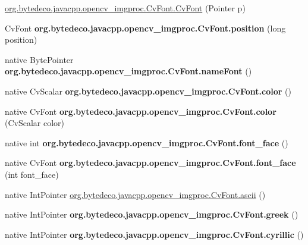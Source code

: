 \begin{DoxyCompactItemize}
\item 
\hyperlink{group__imgproc_ga88da32852b924d5138270b0fbb8e21ce}{org.\+bytedeco.\+javacpp.\+opencv\+\_\+imgproc.\+Cv\+Font.\+Cv\+Font} (Pointer p)
\item 
\mbox{\label{group__imgproc_gaf61409c9e77974c682889969bcf06fb2}} 
Cv\+Font {\bfseries org.\+bytedeco.\+javacpp.\+opencv\+\_\+imgproc.\+Cv\+Font.\+position} (long position)
\item 
\mbox{\label{group__imgproc_ga7c4c2e7ab51e67c86496662b0b0a2f98}} 
native Byte\+Pointer {\bfseries org.\+bytedeco.\+javacpp.\+opencv\+\_\+imgproc.\+Cv\+Font.\+name\+Font} ()
\item 
\mbox{\label{group__imgproc_gabe989de77a7edb13f9926655a5456d08}} 
native Cv\+Scalar {\bfseries org.\+bytedeco.\+javacpp.\+opencv\+\_\+imgproc.\+Cv\+Font.\+color} ()
\item 
\mbox{\label{group__imgproc_gab77c779ef741a907a31b860b3373b279}} 
native Cv\+Font {\bfseries org.\+bytedeco.\+javacpp.\+opencv\+\_\+imgproc.\+Cv\+Font.\+color} (Cv\+Scalar color)
\item 
\mbox{\label{group__imgproc_ga5c485323cfded3d1860513142d07cc7d}} 
native int {\bfseries org.\+bytedeco.\+javacpp.\+opencv\+\_\+imgproc.\+Cv\+Font.\+font\+\_\+face} ()
\item 
\mbox{\label{group__imgproc_ga7323aa5149ea934f9f9a14f3159164b2}} 
native Cv\+Font {\bfseries org.\+bytedeco.\+javacpp.\+opencv\+\_\+imgproc.\+Cv\+Font.\+font\+\_\+face} (int font\+\_\+face)
\item 
native Int\+Pointer \hyperlink{group__imgproc_ga172965ffbfb59bdefa408680e0b5ff62}{org.\+bytedeco.\+javacpp.\+opencv\+\_\+imgproc.\+Cv\+Font.\+ascii} ()
\item 
\mbox{\label{group__imgproc_ga6f393fc4300b59f0cf1e5865eb51e193}} 
native Int\+Pointer {\bfseries org.\+bytedeco.\+javacpp.\+opencv\+\_\+imgproc.\+Cv\+Font.\+greek} ()
\item 
\mbox{\label{group__imgproc_gad3612d8aa6ffe768f5a106034bae4f97}} 
native Int\+Pointer {\bfseries org.\+bytedeco.\+javacpp.\+opencv\+\_\+imgproc.\+Cv\+Font.\+cyrillic} ()

\end{DoxyCompactItemize}
